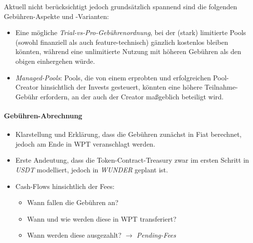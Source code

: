 \begin{Assumption}[Gebühren]
\vspace{0.5cm}	

Aktuell nicht berücksichtigt jedoch grundsätzlich spannend sind die folgenden Gebühren-Aspekte und -Varianten:

\begin{itemize}
	\item Eine mögliche \textit{Trial-vs-Pro-Gebührenordnung}, bei der (stark) limitierte Pools (sowohl finanziell als auch feature-technisch) gänzlich kostenlos bleiben könnten, während eine unlimitierte Nutzung mit höheren Gebühren als den obigen einhergehen würde.
	\item \textit{Managed-Pools}: Pools, die von einem erprobten und erfolgreichen Pool-Creator hinsichtlich der Invests gesteuert, könnten eine höhere Teilnahme-Gebühr erfordern, an der auch der Creator maßgeblich beteiligt wird. 
\end{itemize}	

\end{Assumption}

\vspace{0.5cm}



\paragraph{Gebühren-Abrechnung}
\textbf{ }
\vspace{0.2cm}





\begin{itemize}
	\item Klarstellung und Erklärung, dass die Gebühren zunächst in Fiat berechnet, jedoch am Ende in WPT veranschlagt werden.
	\item Erste Andeutung, dass die Token-Contract-Treasury zwar im ersten Schritt in \textit{USDT} modelliert, jedoch in \textit{WUNDER} geplant ist.
	\item Cash-Flows hinsichtlich der Fees:
	\begin{itemize}
		\item Wann fallen die Gebühren an? 
		\item Wann und wie werden diese in WPT transferiert? 
		\item Wann werden diese ausgezahlt? $\rightarrow$ \textit{Pending-Fees}
	\end{itemize}
\end{itemize}

\vspace{0.5cm}

